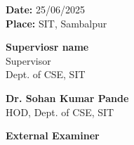 \vspace{1cm}
\flushleft
\textbf{Date:} 25/06/2025 \\
\textbf{Place:} SIT, Sambalpur 
\\
\vspace{0.5cm}
\flushright
\begin{minipage}[t]{.32\textwidth}
	\vspace{1cm}
	\textbf{Superviosr name} \\
	Supervisor \\
	Dept. of CSE, SIT
\end{minipage}
\begin{minipage}[t]{.32\textwidth}
	\vspace{1cm}
	\textbf{Dr. Sohan Kumar Pande} \\
	HOD, Dept. of CSE, SIT  \vspace{1.5cm}
\end{minipage}
\begin{minipage}[t]{.32\textwidth}
	\vspace{1cm}
	\textbf{External Examiner} 
\end{minipage}

\clearpage
